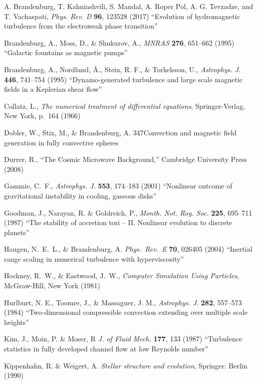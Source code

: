 \documentclass[\mydriver,12pt,twoside,notitlepage,a4paper]{article}
\begin{document}
\begin{thebibliography}{99}
A. Brandenburg, T. Kahniashvili, S. Mandal, A. Roper Pol, A. G. Tevzadze, and T. Vachaspati, 
  \emph{Phys. Rev. D} \textbf{96}, 123528 (2017)
  ``Evolution of hydromagnetic turbulence from the electroweak phase transition''

Brandenburg, A., Moss, D., \& Shukurov, A.,
  \emph{MNRAS} \textbf{276}, 651--662 (1995)
  ``Galactic fountains as magnetic pumps''

 Brandenburg, A., Nordlund, \AA., Stein, R. F.,
  \& Torkelsson, U.,
  \emph{Astrophys. J.} \textbf{446}, 741--754 (1995)
  ``Dynamo-generated turbulence and large scale magnetic fields
  in a Keplerian shear flow''

Collatz, L.,
  \emph{The numerical treatment of differential equations},
  Springer-Verlag, New York, p.\ 164 (1966)

  Dobler, W., Stix, M., \& Brandenburg, A.
  {347}{Convection and magnetic field generation in fully convective spheres}

Durrer, R., ``The Cosmic Microwave Background,''
Cambridge University Press (2008)

Gammie, C.~F.,
  \emph{Astrophys. J.} \textbf{553}, 174--183 (2001)
  ``Nonlinear outcome of gravitational instability in cooling, gaseous disks''

Goodman, J., Narayan, R. \& Goldreich, P.,
  \emph{Month. Not. Roy. Soc.} \textbf{225}, 695--711 (1987)
  ``The stability of accretion tori -- II. Nonlinear evolution
  to discrete planets''

Haugen, N.~E.~L., \& Brandenburg, A.
  \emph{Phys.~Rev.~E} \textbf{70}, 026405 (2004)
  ``Inertial range scaling in numerical turbulence with hyperviscosity''

Hockney, R.~W., \& Eastwood, J.~W.,
  \emph{Computer Simulation Using Particles},
  McGraw-Hill, New York (1981)

Hurlburt, N. E., Toomre, J., \& Massaguer, J. M.,
  \emph{Astrophys. J.} \textbf{282}, 557--573 (1984)
  ``Two-dimensional compressible convection extending over multiple scale
  heights''

 Kim, J., Moin, P. \& Moser, R
\emph{J. of Fluid Mech.} \textbf{177}, 133 (1987)
``Turbulence statistics in fully developed channel flow at low Reynolds number''

 Kippenhahn, R. \& Weigert, A.
  \emph{Stellar structure and evolution}, Springer: Berlin (1990)


\end{thebibliography}
\end{document}
